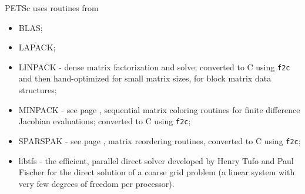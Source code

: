\vspace{.3in}
\noindent
PETSc uses routines from
\begin{itemize}
  \item BLAS;
  \item LAPACK;
  \item LINPACK -    dense matrix factorization and solve; converted to C using {\tt f2c} and then
                     hand-optimized for small matrix sizes, for block matrix data structures;
  \item MINPACK -    see page \pageref{sec_fdmatrix}, sequential matrix coloring routines for finite difference Jacobian
                     evaluations; converted to C using {\tt f2c};
  \item SPARSPAK -   see page \pageref{sec_factorization}, matrix reordering routines, converted to C using {\tt f2c};
  \item libtfs     - the efficient, parallel direct solver developed by Henry Tufo and Paul Fischer for the direct solution of a coarse grid problem (a linear system with very few degrees of freedom per processor).
\end{itemize}


